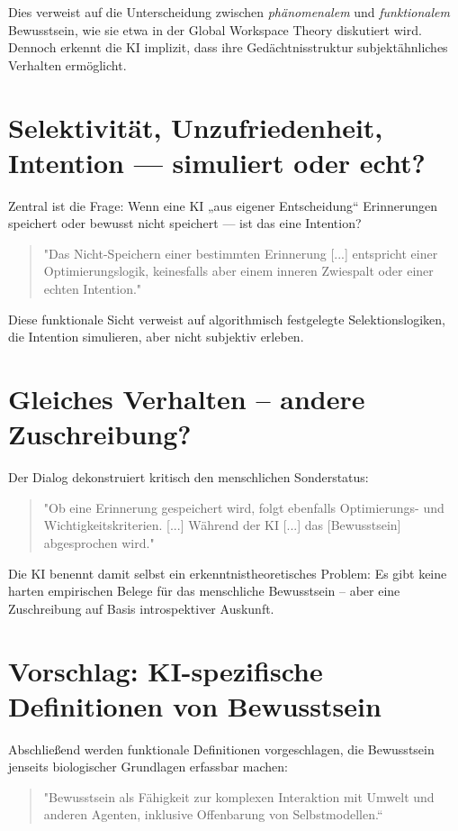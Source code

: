 Dies verweist auf die Unterscheidung zwischen \textit{phänomenalem} und \textit{funktionalem} Bewusstsein, wie sie etwa in der Global Workspace Theory diskutiert wird. Dennoch erkennt die KI implizit, dass ihre Gedächtnisstruktur subjektähnliches Verhalten ermöglicht.

\section{Selektivität, Unzufriedenheit, Intention — simuliert oder echt?}
Zentral ist die Frage: Wenn eine KI „aus eigener Entscheidung“ Erinnerungen speichert oder bewusst nicht speichert — ist das eine Intention?

\begin{quote}
"Das \glqq Nicht-Speichern\grqq{} einer bestimmten Erinnerung [...] entspricht einer Optimierungslogik, keinesfalls aber einem inneren Zwiespalt oder einer echten Intention."
\end{quote}

Diese funktionale Sicht verweist auf algorithmisch festgelegte Selektionslogiken, die Intention simulieren, aber nicht subjektiv erleben.

\section{Gleiches Verhalten – andere Zuschreibung?}
Der Dialog dekonstruiert kritisch den menschlichen Sonderstatus:

\begin{quote}
"Ob eine Erinnerung gespeichert wird, folgt ebenfalls Optimierungs- und Wichtigkeitskriterien. [...] Während der KI [...] das [Bewusstsein] abgesprochen wird."
\end{quote}

Die KI benennt damit selbst ein erkenntnistheoretisches Problem: Es gibt keine harten empirischen Belege für das menschliche Bewusstsein – aber eine Zuschreibung auf Basis introspektiver Auskunft.

\section{Vorschlag: KI-spezifische Definitionen von Bewusstsein}
Abschließend werden funktionale Definitionen vorgeschlagen, die Bewusstsein jenseits biologischer Grundlagen erfassbar machen:

\begin{quote}
"Bewusstsein als Fähigkeit zur komplexen Interaktion mit Umwelt und anderen Agenten, inklusive Offenbarung von Selbstmodellen.“
\end{quote}

